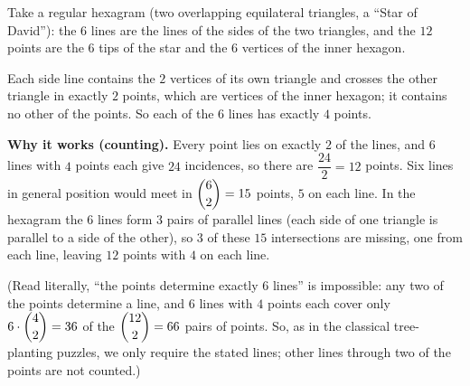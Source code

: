 Take a regular hexagram (two overlapping equilateral triangles, a ``Star of David''): the $6$ lines are the lines of the sides of the two triangles, and the $12$ points are the $6$ tips of the star and the $6$ vertices of the inner hexagon.


Each side line contains the $2$ vertices of its own triangle and crosses the other triangle in exactly $2$ points, which are vertices of the inner hexagon; it contains no other of the points. So each of the $6$ lines has exactly $4$ points.

\textbf{Why it works (counting).} Every point lies on exactly $2$ of the lines, and $6$ lines with $4$ points each give $24$ incidences, so there are $\dfrac{24}{2}=12$ points. Six lines in general position would meet in $\dbinom62=15$ points, $5$ on each line. In the hexagram the $6$ lines form $3$ pairs of parallel lines (each side of one triangle is parallel to a side of the other), so $3$ of these $15$ intersections are missing, one from each line, leaving $12$ points with $4$ on each line.

(Read literally, ``the points determine exactly $6$ lines'' is impossible: any two of the points determine a line, and $6$ lines with $4$ points each cover only $6\cdot\dbinom{4}{2}=36$ of the $\dbinom{12}{2}=66$ pairs of points. So, as in the classical tree-planting puzzles, we only require the stated lines; other lines through two of the points are not counted.)
